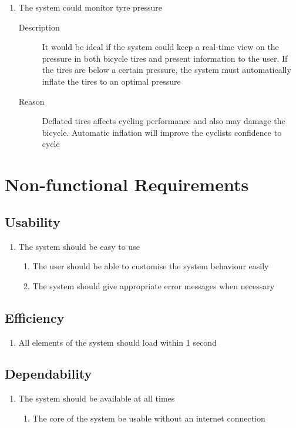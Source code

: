 \documentclass[a4paper]{report}
\begin{document}
\begin{enumerate}[label=\ref*{sec:func_req}.\arabic*.,leftmargin=*]
\item The system could monitor tyre pressure
\begin{description}
\item[Description] It would be ideal if the system could keep a real-time view on the pressure in both bicycle tires and present information to the user. If the tires are below a certain pressure, the system must automatically inflate the tires to an optimal pressure
\item[Reason] Deflated tires affects cycling performance and also may damage the bicycle. Automatic inflation will improve the cyclists confidence to cycle
\end{description}
\end{enumerate}

\section{Non-functional Requirements}
\subsection{Usability}
\label{usability}
\begin{enumerate}[label=\ref*{usability}.\arabic*.,leftmargin=*]
\item The system should be easy to use
\begin{enumerate}[label*=\arabic*.]
\item The user should be able to customise the system behaviour easily
\item The system should give appropriate error messages when necessary
\end{enumerate}
\end{enumerate}
\subsection{Efficiency}
\label{efficiency}
\begin{enumerate}[label=\ref*{efficiency}.\arabic*.,leftmargin=*]
\item All elements of the system should load within 1 second
\end{enumerate}
\subsection{Dependability}
\label{dependability}
\begin{enumerate}[label=\ref*{dependability}.\arabic*.,leftmargin=*]
\item The system should be available at all times
\begin{enumerate}[label*=\arabic*.]
\item The core of the system be usable without an internet connection
\end{enumerate}
\end{enumerate}
\end{document}
